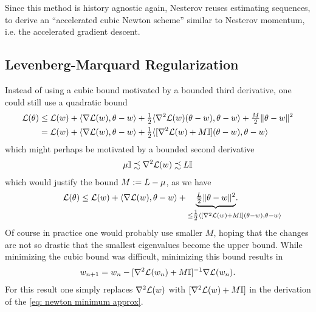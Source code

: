Since this method is history agnostic again, Nesterov reuses estimating
sequences, to derive an ``accelerated cubic Newton scheme'' \parencite[Section
4.2]{nesterovLecturesConvexOptimization2018} similar to Nesterov momentum, i.e.
the accelerated gradient descent.

\subsection{Levenberg-Marquard Regularization}\label{subsec: levenberg-marquard regularization}

Instead of using a cubic bound motivated by a bounded third derivative, one
could still use a quadratic bound
\begin{align*}
	\mathcal{L}(\theta)
	&\le \mathcal{L}(w) + \langle \nabla\mathcal{L}(w), \theta-w \rangle
	+ \tfrac12\langle \nabla^2\mathcal{L}(w)(\theta-w), \theta-w \rangle
	+ \tfrac{M}2\|\theta-w\|^2\\
	&= \mathcal{L}(w) + \langle \nabla\mathcal{L}(w), \theta-w \rangle
	+ \tfrac12\langle [\nabla^2\mathcal{L}(w)+M\mathbb{I}](\theta-w), \theta-w \rangle
\end{align*}
which might perhaps be motivated by a bounded second derivative
\begin{align*}
	\mu\mathbb{I} \precsim \nabla^2\mathcal{L}(w) \precsim L\mathbb{I}
\end{align*}
which would justify the bound \(M:=L-\mu\), as we have
\begin{align}
	\label{eq: levenberg-marquard justification}
	\Loss(\theta)
	&\le \Loss(\weights) + \langle \nabla\Loss(\weights), \theta-\weights \rangle
	+ \underbrace{\tfrac{\ubound}2\|\theta-\weights\|^2\mathrlap{.}}_{
		\le \tfrac12\langle
			[\nabla^2\Loss(\weights)+M\identity]
		\mathrlap{
			(\theta-\weights),
				\theta-\weights
			\rangle
		}
	}
\end{align}
Of course in practice one would probably use smaller \(M\), hoping that
the changes are not so drastic that the smallest eigenvalues become the
upper bound. While minimizing the cubic bound was difficult, minimizing this
bound results in
\begin{align}\label{eq: levenberg-marquard regularization}
	w_{n+1}
	= w_n - [\nabla^2\mathcal{L}(w_n)+M\mathbb{I}]^{-1}\nabla\mathcal{L}(w_n).
\end{align}
For this result one simply replaces \(\nabla^2\mathcal{L}(w)\) with
\([\nabla^2\mathcal{L}(w)+M\mathbb{I}]\) in the derivation of the \ref{eq:
newton minimum approx}.

